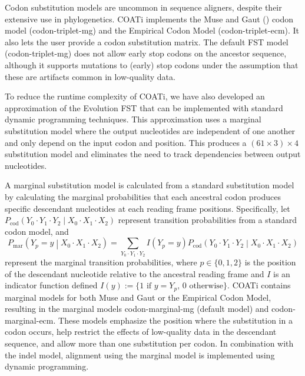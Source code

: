Codon substitution models are uncommon in sequence aligners, despite their extensive use in phylogenetics.
COATi implements the Muse and Gaut (\citeyear{muse_gaut_1994}) codon model (codon-triplet-mg) and the Empirical Codon Model  (codon-triplet-ecm).
It also lets the user provide a codon substitution matrix.
The default FST model (codon-triplet-mg) does not allow early stop codons on the ancestor sequence, although it supports mutations to (early) stop codons under the assumption that these are artifacts common in low-quality data.

To reduce the runtime complexity of COATi, we have also developed an approximation of the Evolution FST that can be implemented with standard dynamic programming techniques. This approximation uses a marginal substitution model where the output nucleotides are independent of one another and only depend on the input codon and position. This produces a $\left(61 \times 3 \right) \times 4$ substitution model and eliminates the need to track dependencies between output nucleotides.

A marginal substitution model is calculated from a standard substitution model by calculating the marginal probabilities that each ancestral codon produces specific descendant nucleotides at each reading frame positions.
%
Specifically, let
$P_\text{cod}\left(Y_0 \cdot Y_1 \cdot Y_2 \middle| X_0 \cdot X_1 \cdot X_2\right)$ represent transition probabilities from a standard codon model, and
%
\[
P_\text{mar}\left(Y_p = y \middle| X_0 \cdot X_1 \cdot X_2\right) =
\sum_{Y_0 \cdot Y_1 \cdot Y_2} I(Y_p = y) P_\text{cod}\left(Y_0 \cdot Y_1 \cdot Y_2 \middle| X_0 \cdot X_1 \cdot X_2\right)
\]
%
represent the marginal transition probabilities, where
$p \in \{0, 1, 2\}$ is the position of the descendant nucleotide relative to the ancestral reading frame and $I$ is an indicator function defined
%
$I(y) := \{ 1 \text{ if } y = Y_p\text{, } 0 \text{ otherwise}\}$.
%
COATi contains marginal models for both Muse and Gaut or the Empirical Codon Model, resulting in the marginal models codon-marginal-mg (default model) and codon-marginal-ecm.
These models emphasize the position where the substitution in a codon occurs, help restrict the effects of low-quality data in the descendant sequence, and allow more than one substitution per codon.
In combination with the indel model, alignment using the marginal model is implemented using dynamic programming.
